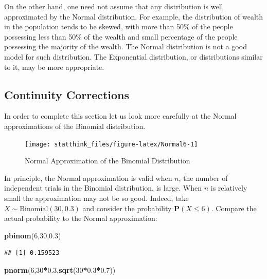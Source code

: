 \documentclass[
]{krantz}
\makeatletter
\newenvironment{Shaded}{\begin{snugshade}}{\end{snugshade}}
\newcommand{\DecValTok}[1]{\textcolor[rgb]{0.00,0.00,0.81}{#1}}
\newcommand{\FloatTok}[1]{\textcolor[rgb]{0.00,0.00,0.81}{#1}}
\newcommand{\KeywordTok}[1]{\textcolor[rgb]{0.13,0.29,0.53}{\textbf{#1}}}
\newcommand{\NormalTok}[1]{#1}
\newcommand{\OperatorTok}[1]{\textcolor[rgb]{0.81,0.36,0.00}{\textbf{#1}}}
\newcommand{\Prob}{\mathbf{P}}
\newenvironment{kframe}{%
\medskip{}
\setlength{\fboxsep}{.8em}
 \def\at@end@of@kframe{}%
 \ifinner\ifhmode%
  \def\at@end@of@kframe{\end{minipage}}%
  \begin{minipage}{\columnwidth}%
 \fi\fi%
 \def\FrameCommand##1{\hskip\@totalleftmargin \hskip-\fboxsep
 \colorbox{shadecolor}{##1}\hskip-\fboxsep
     \hskip-\linewidth \hskip-\@totalleftmargin \hskip\columnwidth}%
 \MakeFramed {\advance\hsize-\width
   \@totalleftmargin\z@ \linewidth\hsize
   \@setminipage}}%
 {\par\unskip\endMakeFramed%
 \at@end@of@kframe}
\renewenvironment{Shaded}{\begin{kframe}}{\end{kframe}}
\theoremstyle{definition}
\theoremstyle{definition}
\theoremstyle{definition}
\theoremstyle{remark}
\makeatother
\begin{document}
On the other hand, one need not assume that any distribution is well
approximated by the Normal distribution. For example, the distribution
of wealth in the population tends to be skewed, with more than 50\% of
the people possessing less than 50\% of the wealth and small percentage
of the people possessing the majority of the wealth. The Normal
distribution is not a good model for such distribution. The Exponential
distribution, or distributions similar to it, may be more appropriate.

\hypertarget{continuity-corrections}{%
\subsection{Continuity Corrections}\label{continuity-corrections}}

In order to complete this section let us look more carefully at the
Normal approximations of the Binomial distribution.

\begin{figure}

{\centering \texttt{[image: statthink\_files/figure-latex/Normal6-1]} 

}

\caption{Normal Approximation of the Binomial Distribution}\label{fig:Normal6}
\end{figure}

In principle, the Normal approximation is valid when \(n\), the number of
independent trials in the Binomial distribution, is large. When \(n\) is
relatively small the approximation may not be so good. Indeed, take
\(X \sim \mathrm{Binomial}(30,0.3)\) and consider the probability
\(\Prob(X \leq 6)\). Compare the actual probability to the Normal
approximation:

\begin{Shaded}
\begin{Highlighting}[]
\KeywordTok{pbinom}\NormalTok{(}\DecValTok{6}\NormalTok{,}\DecValTok{30}\NormalTok{,}\FloatTok{0.3}\NormalTok{)}
\end{Highlighting}
\end{Shaded}

\begin{verbatim}
## [1] 0.159523
\end{verbatim}

\begin{Shaded}
\begin{Highlighting}[]
\KeywordTok{pnorm}\NormalTok{(}\DecValTok{6}\NormalTok{,}\DecValTok{30}\OperatorTok{*}\FloatTok{0.3}\NormalTok{,}\KeywordTok{sqrt}\NormalTok{(}\DecValTok{30}\OperatorTok{*}\FloatTok{0.3}\OperatorTok{*}\FloatTok{0.7}\NormalTok{))}
\end{Highlighting}
\end{Shaded}
\end{document}
